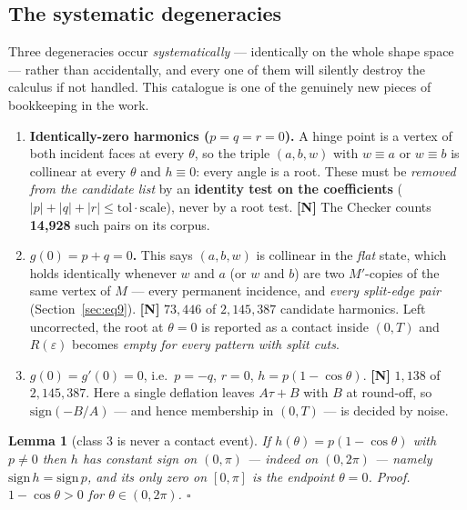 \documentclass[11pt,a4paper]{article}
\newtheorem{lemma}[theorem]{Lemma}
\theoremstyle{definition}
\newcommand{\Mprime}{M'}
\begin{document}
\subsection{The systematic degeneracies}
\label{sec:degeneracies}

Three degeneracies occur \emph{systematically} --- identically on the whole shape space ---
rather than accidentally, and every one of them will silently destroy the calculus if not
handled. This catalogue is one of the genuinely new pieces of bookkeeping in the work.

\begin{enumerate}\itemsep3pt
\item \textbf{Identically-zero harmonics ($p=q=r=0$).} A hinge point is a vertex of both
incident faces at every $\theta$, so the triple $(a,b,w)$ with $w\equiv a$ or $w\equiv b$ is
collinear at every $\theta$ and $h\equiv0$: every angle is a root. These must be
\emph{removed from the candidate list} by an \textbf{identity test on the coefficients}
($|p|+|q|+|r|\le\mathrm{tol}\cdot\mathrm{scale}$), never by a root test. \textbf{[N]} The
Checker counts \textbf{14{,}928} such pairs on its corpus.

\item \textbf{$g(0)=p+q=0$.} This says $(a,b,w)$ is collinear in the \emph{flat} state, which
holds identically whenever $w$ and $a$ (or $w$ and $b$) are two $\Mprime$-copies of the same
vertex of $M$ --- every permanent incidence, and \emph{every split-edge pair}
(Section~\ref{sec:eq9}). \textbf{[N]} $73{,}446$ of $2{,}145{,}387$ candidate harmonics.
Left uncorrected, the root at $\theta=0$ is reported as a contact inside $(0,T)$ and
$R(\varepsilon)$ becomes \emph{empty for every pattern with split cuts}.

\item \textbf{$g(0)=g'(0)=0$}, i.e.\ $p=-q$, $r=0$, $h=p(1-\cos\theta)$. \textbf{[N]}
$1{,}138$ of $2{,}145{,}387$. Here a single deflation leaves $A\tau+B$ with $B$ at round-off,
so $\mathrm{sign}(-B/A)$ --- and hence membership in $(0,T)$ --- is decided by noise.
\end{enumerate}

\begin{lemma}[class 3 is never a contact event]
\label{lem:t51e}
If $h(\theta)=p(1-\cos\theta)$ with $p\ne0$ then $h$ has constant sign on $(0,\pi)$ ---
indeed on $(0,2\pi)$ --- namely $\mathrm{sign}\,h=\mathrm{sign}\,p$, and its only zero on
$[0,\pi]$ is the endpoint $\theta=0$. \emph{Proof.} $1-\cos\theta>0$ for
$\theta\in(0,2\pi)$. \hfill$\square$
\end{lemma}
\end{document}
